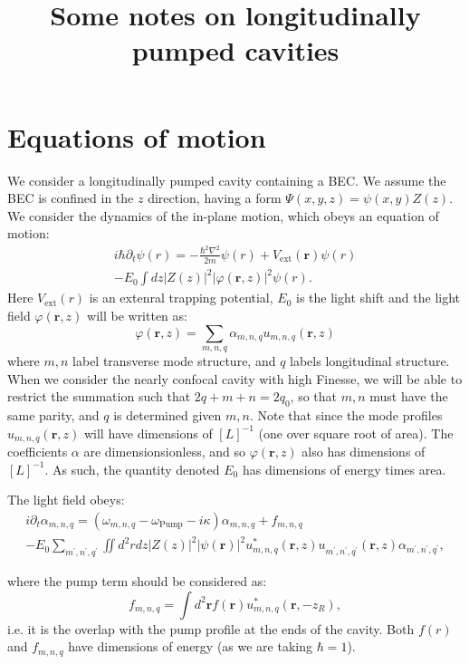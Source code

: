 \documentclass[twocolumn]{revtex4-1}
\renewcommand{\vec}[1]{\mathbf{#1}}
\begin{document}
\title{Some notes on longitudinally pumped cavities}
\maketitle

\section{Equations of motion}
\label{sec:equations-motion}

We consider a longitudinally pumped cavity containing a BEC.  We
assume the BEC is confined in the $z$ direction, having a form
$\Psi(x,y,z) =\psi(x,y) Z(z)$.  We consider the dynamics of the
in-plane motion, which obeys an equation of motion:
\begin{multline}
  \label{eq:1}
  i \hbar \partial_t \psi(r) =
  - \frac{\hbar^2 \nabla^2}{2m} \psi(r)
  + V_{\text{ext}}(\vec{r}) \psi(r)
  \\- E_0
  \int dz |Z(z)|^2 |\varphi(\vec{r},z)|^2  \psi(r).
\end{multline}
Here $V_{\text{ext}}(r)$ is an extenral trapping potential, $E_0$ is the
light shift and the light field $\varphi(\vec{r},z)$ will be written
as:
\begin{equation}
\label{eq:2}
  \varphi(\vec{r}, z) =
  \sum_{m,n,q} \alpha_{m,n,q} u_{m,n,q}(\vec{r},z)
\end{equation}
where $m,n$ label transverse mode structure, and $q$ labels
longitudinal structure.  When we consider the nearly confocal cavity
with high Finesse, we will be able to restrict the summation such that
$2q + m+n=2q_0$, so that $m,n$ must have the same parity, and $q$ is
determined given $m,n$.  Note that since the mode profiles
$u_{m,n,q}(\vec{r},z)$ will have dimensions of $[L]^{-1}$ (one over
square root of area).  The coefficients $\alpha$ are
dimensionsionless, and so $\varphi(\vec{r},z)$ also has dimensions of
$[L]^{-1}$. As such, the quantity denoted $E_0$ has dimensions of
energy times area.
\begin{widetext}
The light field obeys:
\begin{multline}
  i \partial_t \alpha_{m,n,q}
  = (\omega_{m,n,q} - \omega_\text{Pump} -i \kappa) \alpha_{m,n,q} 
  +
  f_{m,n,q} \\
  - E_0 \sum_{m^\prime, n^\prime, q^\prime}
  \iint d^2r  dz |Z(z)|^2 |\psi(\vec{r})|^2
  u^\ast_{m,n,q}(\vec{r},z)
  u^{}_{m^\prime,n^\prime,q^\prime}(\vec{r},z) \alpha_{m^\prime, n^\prime, q^\prime},
\end{multline}
\end{widetext}
where the pump term should be considered as:
\begin{displaymath}
  f_{m,n,q} = \int d^2\vec{r} f(\vec{r}) u^\ast_{m,n,q}(\vec{r}, - z_R),
\end{displaymath}
i.e. it is the overlap with the pump profile at the ends of the
cavity.  Both $f(r)$ and $f_{m,n,q}$ have dimensions of energy (as we
are taking $\hbar=1$).
\end{document}
